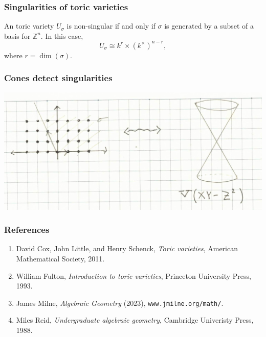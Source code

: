 \documentclass{beamer}
\theoremstyle{definition}
\theoremstyle{definition}
\begin{document}
\begin{frame}
\frametitle{Singularities of toric varieties}
\begin{theorem}
An toric variety $U_\sigma$ is non-singular if and only if $\sigma$ is generated by a subset of a basis for $\mathbb{Z}^n$.
In this case,
$$U_\sigma \cong k^r \times (k^\times)^{n-r},$$
where $r = \dim(\sigma)$.
\end{theorem}
\end{frame}

\begin{frame}
\frametitle{Cones detect singularities}
\includegraphics[width=\textwidth]{cone_and_variety}
\end{frame}

\begin{frame}
\frametitle{References}
\begin{enumerate}%
\item[]
David Cox, John Little, and Henry Schenck,
\emph{Toric varieties},
American Mathematical Society, 2011.

\vspace{0.5cm}

\item[]
William Fulton,
\emph{Introduction to toric varieties},
Princeton University Press, 1993.

\vspace{0.5cm}

\item[]
James Milne,
\emph{Algebraic Geometry} (2023),
{ \texttt{www.jmilne.org/math/}}. %

\vspace{0.5cm}

\item[]
Miles Reid,
\emph{Undergraduate algebraic geometry},
Cambridge Univeristy Press, 1988.
\end{enumerate}
\end{frame}
\end{document}

